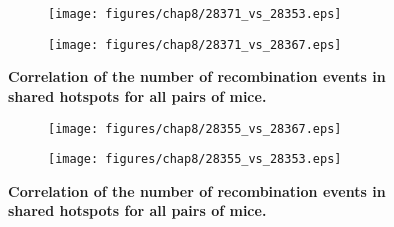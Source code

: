 \begin{figure}[p]
    \centering
    \begin{subfigure}[b]{0.75\textwidth}
        \texttt{[image: figures/chap8/28371\_vs\_28353.eps]}
    \end{subfigure}

    \vspace{0.5cm}

    \begin{subfigure}[b]{0.75\textwidth}
        \texttt{[image: figures/chap8/28371\_vs\_28367.eps]}
    \end{subfigure}

    \caption[Correlation of the number of recombination events in shared hotspots for all pairs of mice]
    {\textbf{Correlation of the number of recombination events in shared hotspots for all pairs of mice.}
    }
\label{fig:pairwise-RR-shared-BIS-1}
\end{figure}




\begin{figure}[p]
    \centering
   
	\begin{subfigure}[b]{0.75\textwidth}
        \texttt{[image: figures/chap8/28355\_vs\_28367.eps]}
    \end{subfigure}

    \vspace{0.5cm}
    
	\begin{subfigure}[b]{0.75\textwidth}
        \texttt{[image: figures/chap8/28355\_vs\_28353.eps]}
    \end{subfigure}


    \caption[Correlation of the number of recombination events in shared hotspots for all pairs of mice]
    {\textbf{Correlation of the number of recombination events in shared hotspots for all pairs of mice.}
    }
\label{fig:pairwise-RR-shared-BIS2}
\end{figure}







